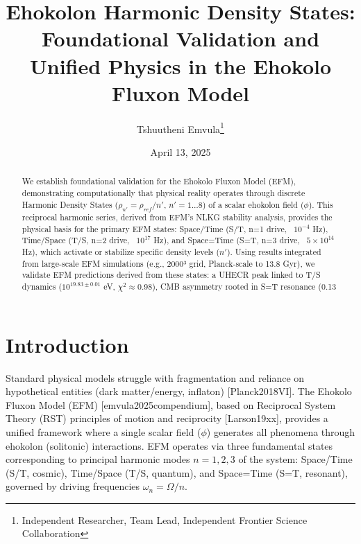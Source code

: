 \documentclass[11pt]{article}
\title{Ehokolon Harmonic Density States: Foundational Validation and Unified Physics in the Ehokolo Fluxon Model}
\author{Tshuutheni Emvula\thanks{Independent Researcher, Team Lead, Independent Frontier Science Collaboration}}
\date{April 13, 2025} %
\begin{document}
\maketitle

\begin{abstract} %
We establish foundational validation for the Ehokolo Fluxon Model (EFM), demonstrating computationally that physical reality operates through discrete Harmonic Density States (\(\rho_{n'} = \rho_{ref}/n'\), \(n' = 1 \dots 8\)) of a scalar ehokolon field (\(\phi\)). This reciprocal harmonic series, derived from EFM's NLKG stability analysis, provides the physical basis for the primary EFM states: Space/Time (S/T, n=1 drive, ~\(10^{-4}\) Hz), Time/Space (T/S, n=2 drive, ~\(10^{17}\) Hz), and Space=Time (S=T, n=3 drive, ~\(5\times 10^{14}\) Hz), which activate or stabilize specific density levels (\(n'\)). Using results integrated from large-scale EFM simulations (e.g., 2000³ grid, Planck-scale to 13.8 Gyr), we validate EFM predictions derived from these states: a UHECR peak linked to T/S dynamics (\(10^{19.83 \pm 0.01}\) eV, \(\chi^2 \approx 0.98\)), CMB asymmetry rooted in S=T resonance (0.13%
\end{abstract}

\section{Introduction}
Standard physical models struggle with fragmentation and reliance on hypothetical entities (dark matter/energy, inflaton) [Planck2018VI]. The Ehokolo Fluxon Model (EFM) [emvula2025compendium], based on Reciprocal System Theory (RST) principles of motion and reciprocity [Larson19xx], provides a unified framework where a single scalar field (\(\phi\)) generates all phenomena through ehokolon (solitonic) interactions. EFM operates via three fundamental states corresponding to principal harmonic modes \(n=1, 2, 3\) of the system: Space/Time (S/T, cosmic), Time/Space (T/S, quantum), and Space=Time (S=T, resonant), governed by driving frequencies \(\omega_n = \Omega/n\).
\end{document}
